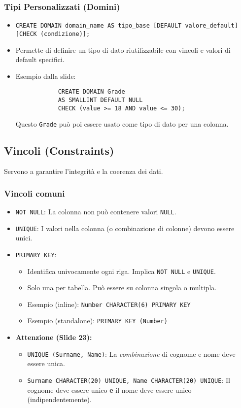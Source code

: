 \documentclass{article}
\begin{document}
	\subsubsection{Tipi Personalizzati (Domini)}
	\begin{itemize}
		\item \texttt{CREATE DOMAIN domain\_name AS tipo\_base [DEFAULT valore\_default] [CHECK (condizione)];}
		\item Permette di definire un tipo di dato riutilizzabile con vincoli e valori di default specifici.
		\item Esempio dalla slide:
		\begin{verbatim}
			CREATE DOMAIN Grade
			AS SMALLINT DEFAULT NULL
			CHECK (value >= 18 AND value <= 30);
		\end{verbatim}
		Questo \texttt{Grade} può poi essere usato come tipo di dato per una colonna.
	\end{itemize}
	
	\subsection{Vincoli (Constraints)}
	Servono a garantire l'integrità e la coerenza dei dati.
	\subsubsection{Vincoli comuni}
	\begin{itemize}
		\item \texttt{NOT NULL}: La colonna non può contenere valori \texttt{NULL}.
		\item \texttt{UNIQUE}: I valori nella colonna (o combinazione di colonne) devono essere unici.
		\item \texttt{PRIMARY KEY}:
		\begin{itemize}
			\item Identifica univocamente ogni riga. Implica \texttt{NOT NULL} e \texttt{UNIQUE}.
			\item Solo una per tabella. Può essere su colonna singola o multipla.
			\item Esempio (inline): \texttt{Number CHARACTER(6) PRIMARY KEY}
			\item Esempio (standalone): \texttt{PRIMARY KEY (Number)}
		\end{itemize}
		\item \textbf{Attenzione (Slide 23):}
		\begin{itemize}
			\item \texttt{UNIQUE (Surname, Name)}: La \textit{combinazione} di cognome e nome deve essere unica.
			\item \texttt{Surname CHARACTER(20) UNIQUE, Name CHARACTER(20) UNIQUE}: Il cognome deve essere unico \textbf{e} il nome deve essere unico (indipendentemente).
		\end{itemize}
	\end{itemize}
\end{document}
